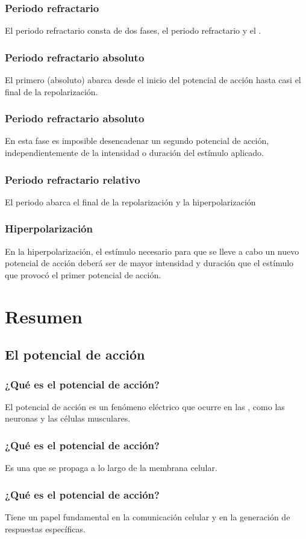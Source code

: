 \documentclass[14pt]{beamer}
\begin{document}
\begin{frame}
\frametitle{Periodo refractario}
El periodo refractario consta de dos fases, el periodo refractario  y el .
\end{frame}
\begin{frame}
\frametitle{Periodo refractario absoluto}
El primero (absoluto) abarca desde el inicio del potencial de acción hasta casi el final de la repolarización.
\end{frame}
\begin{frame}
\frametitle{Periodo refractario absoluto}
En esta fase es imposible desencadenar un segundo potencial de acción, independientemente de la intensidad o duración del estímulo aplicado.
\end{frame}
\begin{frame}
\frametitle{Periodo refractario relativo}
El periodo  abarca el final de la repolarización y la hiperpolarización
\end{frame}
\begin{frame}
\frametitle{Hiperpolarización}
En la hiperpolarización, el estímulo necesario para que se lleve a cabo un nuevo potencial de acción deberá ser de mayor intensidad y duración que el estímulo que provocó el primer potencial de acción.
\end{frame}

\section{Resumen}
\subsection{El potencial de acción}

\begin{frame}
\frametitle{¿Qué es el potencial de acción?}
El potencial de acción es un fenómeno eléctrico que ocurre en las , como las neuronas y las células musculares.
\end{frame}
\begin{frame}
\frametitle{¿Qué es el potencial de acción?}
Es una  \pause que se propaga a lo largo de la membrana celular.
\end{frame}
\begin{frame}
\frametitle{¿Qué es el potencial de acción?}
Tiene un papel fundamental en la comunicación celular y en la generación de respuestas específicas.
\end{frame}
\end{document}
